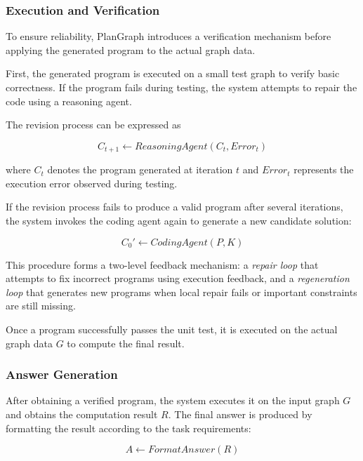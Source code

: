 \documentclass[sigconf,review,anonymous]{acmart}
\begin{document}
\subsubsection{Execution and Verification}

To ensure reliability, PlanGraph introduces a verification
mechanism before applying the generated program to the
actual graph data.

First, the generated program is executed on a small test
graph to verify basic correctness. If the program fails
during testing, the system attempts to repair the code
using a reasoning agent.

The revision process can be expressed as

\begin{equation}
C_{t+1} \leftarrow ReasoningAgent(C_t, Error_t)
\end{equation}

where $C_t$ denotes the program generated at iteration $t$
and $Error_t$ represents the execution error observed during
testing.

If the revision process fails to produce a valid program
after several iterations, the system invokes the coding
agent again to generate a new candidate solution:

\begin{equation}
C_0' \leftarrow CodingAgent(P, K)
\end{equation}

This procedure forms a two-level feedback mechanism:
a \textit{repair loop} that attempts to fix incorrect
programs using execution feedback, and a \textit{regeneration loop}
that generates new programs when local repair fails or
important constraints are still missing.

Once a program successfully passes the unit test, it is
executed on the actual graph data $G$ to compute the final
result.

\subsubsection{Answer Generation}

After obtaining a verified program, the system executes it
on the input graph $G$ and obtains the computation result
$R$. The final answer is produced by formatting the result
according to the task requirements:

\begin{equation}
A \leftarrow FormatAnswer(R)
\end{equation}
\end{document}
